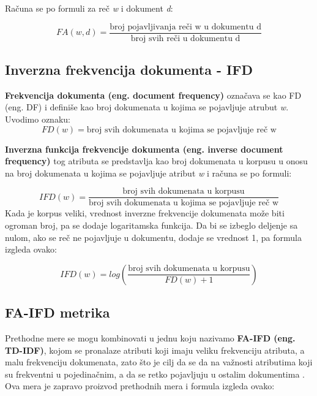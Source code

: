 \documentclass[12pt,oneside]{memoir}
\begin{document}
Računa se po formuli za reč \textit{w} i dokument \textit{d}:

\begin{equation}
	FA(w,d) = \frac{\text{broj pojavljivanja reči w u dokumentu d}}{\text{broj svih reči u dokumentu d}}
\end{equation}

\subsection{Inverzna frekvencija dokumenta - IFD}

\textbf{Frekvencija dokumenta (eng.  document frequency)} označava se kao FD (eng.  DF) i  definiše kao broj dokumenata u kojima se pojavljuje atrubut \textit{w}.  Uvodimo oznaku:
\begin{equation}
	FD(w) = \text{broj svih dokumenata u kojima se pojavljuje reč w}
\end{equation}

\textbf{Inverzna funkcija frekvencije dokumenta (eng.  inverse document frequency)} tog atributa se predstavlja kao broj dokumenata u korpusu u onosu na broj dokumenata u kojima se pojavljuje atribut \textit{w} i računa se po formuli:

\begin{equation}
	IFD(w) = \frac{\text{broj svih dokumenata u korpusu}}{\text{broj svih dokumenata u kojima se pojavljuje reč w}}
\end{equation}
\newline
Kada je korpus veliki,  vrednost inverzne frekvencije dokumenata može biti ogroman broj, pa se dodaje logaritamska funkcija.  Da bi se izbeglo deljenje sa nulom, ako se reč ne pojavljuje u dokumentu,  dodaje se vrednost 1, pa formula izgleda ovako:

\begin{equation}
	IFD(w) = log\left(\frac{\text{broj svih dokumenata u korpusu}}{FD(w) + 1}\right)
\end{equation}

\subsection{FA-IFD metrika}

Prethodne mere se mogu kombinovati u jednu koju nazivamo \textbf{FA-IFD (eng.  TD-IDF)}, kojom se pronalaze atributi koji imaju veliku frekvenciju atributa,  a malu frekvenciju dokumenata, zato što je cilj da se da na važnosti atributima koji su frekventni u pojedinačnim, a da se retko pojavljuju u ostalim dokumentima \cite{JelenaPHD}.  Ova mera je zapravo proizvod prethodnih mera i formula izgleda ovako:
\end{document}
